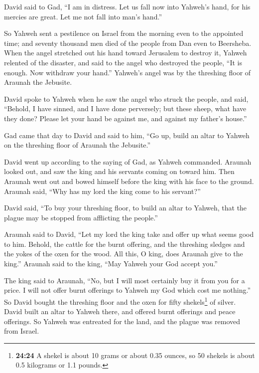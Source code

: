  David said to Gad, ``I am in distress. Let us fall now
into Yahweh's hand, for his mercies are great. Let me not fall into
man's hand.''

 So Yahweh sent a pestilence on Israel from the morning
even to the appointed time; and seventy thousand men died of the people
from Dan even to Beersheba.  When the angel stretched out
his hand toward Jerusalem to destroy it, Yahweh relented of the
disaster, and said to the angel who destroyed the people, ``It is
enough. Now withdraw your hand.'' Yahweh's angel was by the threshing
floor of Araunah the Jebusite.

 David spoke to Yahweh when he saw the angel who struck
the people, and said, ``Behold, I have sinned, and I have done
perversely; but these sheep, what have they done? Please let your hand
be against me, and against my father's house.''

 Gad came that day to David and said to him, ``Go up,
build an altar to Yahweh on the threshing floor of Araunah the
Jebusite.''

 David went up according to the saying of Gad, as Yahweh
commanded.  Araunah looked out, and saw the king and his
servants coming on toward him. Then Araunah went out and bowed himself
before the king with his face to the ground.  Araunah
said, ``Why has my lord the king come to his servant?''

David said, ``To buy your threshing floor, to build an altar to Yahweh,
that the plague may be stopped from afflicting the people.''

 Araunah said to David, ``Let my lord the king take and
offer up what seems good to him. Behold, the cattle for the burnt
offering, and the threshing sledges and the yokes of the oxen for the
wood.  All this, O king, does Araunah give to the king.''
Araunah said to the king, ``May Yahweh your God accept you.''

 The king said to Araunah, ``No, but I will most
certainly buy it from you for a price. I will not offer burnt offerings
to Yahweh my God which cost me nothing.'' So David bought the threshing
floor and the oxen for fifty shekels\footnote{\textbf{24:24} A shekel is
  about 10 grams or about 0.35 ounces, so 50 shekels is about 0.5
  kilograms or 1.1 pounds.} of silver.  David built an
altar to Yahweh there, and offered burnt offerings and peace offerings.
So Yahweh was entreated for the land, and the plague was removed from
Israel.
